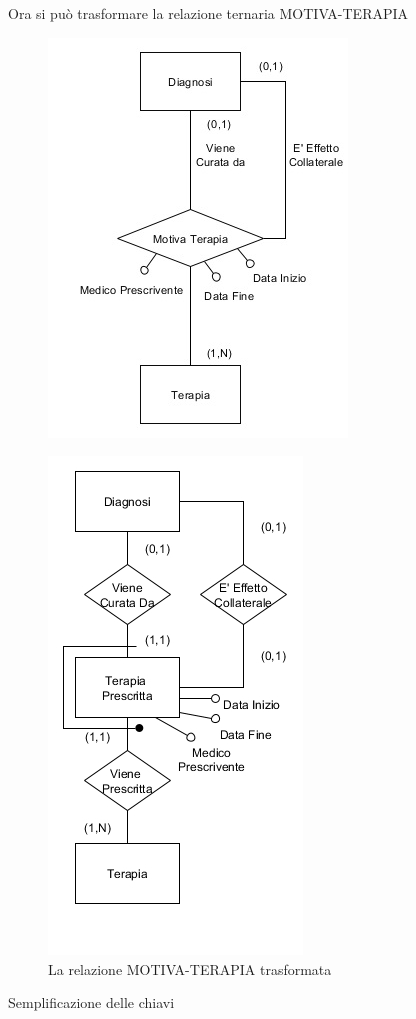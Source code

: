 \documentclass{article}
\begin{document}
Ora si può trasformare la relazione ternaria MOTIVA-TERAPIA

\begin{figure}[!ht] %
  \centering
  \includegraphics[width=.4\linewidth]{piccolo2}
\end{figure}
\begin{figure}[!ht] %
  \centering
  \includegraphics[width=.4\linewidth]{piccolo3}
  \caption{La relazione MOTIVA-TERAPIA trasformata}
  \label{piccolo3}
\end{figure}

Semplificazione delle chiavi
\end{document}
